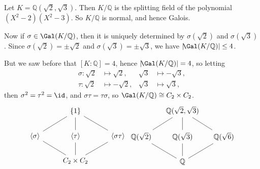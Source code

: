 \documentclass[12pt]{article}
\begin{document}
\begin{exbox}
	Let $K = \mathbb{Q}(\sqrt 2, \sqrt 3)$. Then $K/\mathbb{Q}$ is the splitting field of the polynomial $(X^2-2)(X^2-3)$. So $K/\mathbb{Q}$ is normal, and hence Galois.

	Now if $\sigma \in \Gal(K/\mathbb{Q})$, then it is uniquely determined by $\sigma(\sqrt 2)$ and $\sigma(\sqrt 3)$. Since $\sigma(\sqrt 2) = \pm \sqrt 2$ and $\sigma(\sqrt 3) = \pm \sqrt 3$, we have $|\!\Gal(K/\mathbb{Q})| \leq 4$.

	But we saw before that $[K: \mathbb{Q}] = 4$, hence $|\!\Gal(K/\mathbb{Q})| = 4$, so letting
	\begin{align*}
		\sigma : \sqrt 2 & \mapsto \sqrt 2, & \sqrt 3 &\mapsto - \sqrt 3,\\
		\tau : \sqrt 2 &\mapsto -\sqrt 2, & \sqrt 3 &\mapsto \sqrt 3,
	\end{align*}
	then $\sigma^2 = \tau^2 = \id$, and $\sigma \tau = \tau \sigma$, so $\Gal(K/\mathbb{Q}) \cong C_2 \times C_2$.
	\[
	\begin{tikzcd}
		& \{1\} \arrow[dl, dash] \arrow[dr, dash] \arrow[d, dash]& \\
		\langle \sigma \rangle\arrow[dr, dash] & \langle \tau \rangle \arrow[d, dash] & \langle \sigma \tau \rangle \arrow[dl, dash] \\
						       & C_2 \times C_2 &
	\end{tikzcd}
	\begin{tikzcd}[column sep = small]
		& \mathbb{Q}(\sqrt 2, \sqrt 3) \arrow[dl, dash] \arrow[d, dash] \arrow[dr, dash] & \\
		\mathbb{Q}(\sqrt 2)\arrow[dr, dash] & \mathbb{Q}(\sqrt 3) \arrow[d, dash] & \mathbb{Q}(\sqrt 6) \arrow[dl, dash] \\
						    & \mathbb{Q} &
	\end{tikzcd}
	\]
\end{exbox}

\end{document}
